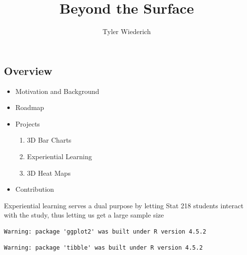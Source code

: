 \documentclass[phd]{nuthesis}
\title{Beyond the Surface}
\author{Tyler Wiederich}
\begin{document}
\maketitle

\begin{abstract}

\end{abstract}

\begin{acknowledgments}

\end{acknowledgments}

\tableofcontents
\listoffigures
\listoftables

\mainmatter

\subsection{Overview}\label{overview}

\begin{itemize}
\tightlist
\item
  Motivation and Background
\item
  Roadmap
\item
  Projects

  \begin{enumerate}
  \def\labelenumi{\arabic{enumi}.}
  \tightlist
  \item
    3D Bar Charts
  \item
    Experiential Learning
  \item
    3D Heat Maps
  \end{enumerate}
\item
  Contribution
\end{itemize}

Experiential learning serves a dual purpose by letting Stat 218 students
interact with the study, thus letting us get a large sample size

\begin{Shaded}
\begin{Highlighting}[]
\end{Highlighting}
\end{Shaded}

\begin{verbatim}
Warning: package 'ggplot2' was built under R version 4.5.2
\end{verbatim}

\begin{verbatim}
Warning: package 'tibble' was built under R version 4.5.2
\end{verbatim}
\end{document}
